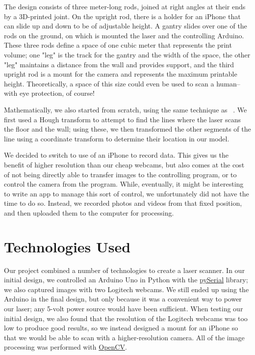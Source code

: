 \documentclass[12pt, letterpaper]{article}
\begin{document}
The design consists of three meter-long rods, joined at right angles at their ends by a 3D-printed joint. On the upright rod, there is a holder for an iPhone that can slide up and down to be of adjustable height. A gantry slides over one of the rods on the ground, on which is mounted the laser and the controlling Arduino. These three rods define a space of one cubic meter that represents the print volume; one "leg" is the track for the gantry and the width of the space, the other "leg" maintains a distance from the wall and provides support, and the third upright rod is a mount for the camera and represents the maximum printable height. Theoretically, a space of this size could even be used to scan a human--with eye protection, of course!

Mathematically, we also started from scratch, using the same technique as ~\cite{dentroman}. We first used a Hough transform to attempt to find the lines where the laser scans the floor and the wall; using these, we then transformed the other segments of the line using a coordinate transform to determine their location in our model. 

We decided to switch to use of an iPhone to record data. This gives us the benefit of higher resolution than our cheap webcams, but also comes at the cost of not being directly able to transfer images to the controlling program, or to control the camera from the program. While, eventually, it might be interesting to write an app to manage this sort of control, we unfortunately did not have the time to do so. Instead, we recorded photos and videos from that fixed position, and then uploaded them to the computer for processing.




\section{Technologies Used} \label{technology}
Our project combined a number of technologies to create a laser scanner.
In our initial design, we controlled an Arduino Uno in Python with the
\href{https://github.com/pyserial/pyserial}{pySerial} library; we also
captured images with two Logitech webcams. We still ended up using the
Arduino in the final design, but only because it was a convenient way to
power our laser; any 5-volt power source would have been sufficient.
When testing our initial design, we also found that the resolution of
the Logitech webcams was too low to produce good results, so we instead
designed a mount for an iPhone so that we would be able to scan with a
higher-resolution camera. All of the image processing was performed with
\href{http://opencv.org}{OpenCV}.
\end{document}

